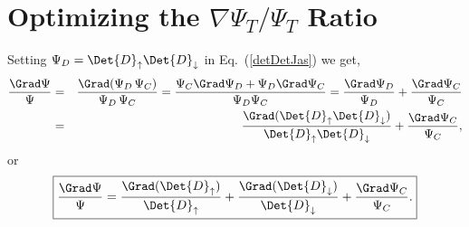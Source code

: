 \section{Optimizing the $\nabla \Psi_T / \Psi_T$ Ratio}\label{gradToDetRatio}
Setting $\Psi_D = \Det{D}_{\uparrow} \Det{D}_{\downarrow}$ in Eq.~(\ref{detDetJas}) we get,
\begin{eqnarray}
\frac{\Grad \Psi}{\Psi} & = &\frac{\Grad (\Psi_{D} \, \Psi_{C})}{\Psi_{D} \, \Psi_{C}}  =  \frac{ \Psi_C \Grad \Psi_{D} + \Psi_{D} \Grad \Psi_{C}}{\Psi_{D} \Psi_{C}} = \frac{\Grad \Psi_{D}}{\Psi_{D}} + \frac{\Grad  \Psi_C}{ \Psi_C}\nonumber\\ & = & \frac{\Grad (\Det{D}_{\uparrow} \Det{D}_{\downarrow})}{\Det{D}_{\uparrow} \Det{D}_{\downarrow}} + \frac{\Grad  \Psi_C}{ \Psi_C}\nonumber,
\end{eqnarray}
or 
\begin{equation}\label{grad_det_ratio_gen}
\boxed{\frac{\Grad \Psi}{\Psi} =  \frac{\Grad (\Det{D}_{\uparrow}) }{\Det{D}_{\uparrow}} + \frac{\Grad (\Det{D}_{\downarrow})}{\Det{D}_{\downarrow}} + \frac{\Grad  \Psi_C}{ \Psi_C}.}
\end{equation}


